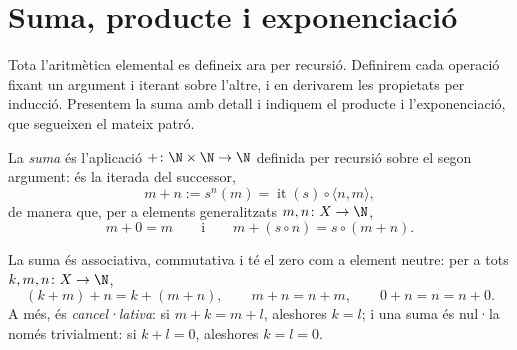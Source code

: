 \section{Suma, producte i exponenciació}\label{sec:aritmetica}

Tota l'aritmètica elemental es defineix ara per recursió. Definirem cada
operació fixant un argument i iterant sobre l'altre, i en derivarem les
propietats per inducció. Presentem la suma amb detall i indiquem el
producte i l'exponenciació, que segueixen el mateix patró.

\begin{definicio}[Suma]\label{def:suma-naturals}
La \emph{suma} és l'aplicació \(+\colon\N\times\N\to\N\) definida per
recursió sobre el segon argument: és la iterada del successor,
\[
m+n:=s^{n}(m)=\operatorname{it}(s)\circ\langle n,m\rangle,
\]
de manera que, per a elements generalitzats \(m,n\colon X\to\N\),
\[
m+0=m
\qquad\text{i}\qquad
m+(s\circ n)=s\circ(m+n).
\]
\end{definicio}

\begin{proposicio}\label{prop:suma}
La suma és associativa, commutativa i té el zero com a element neutre:
per a tots \(k,m,n\colon X\to\N\),
\[
(k+m)+n=k+(m+n),
\qquad
m+n=n+m,
\qquad
0+n=n=n+0 .
\]
A més, és \emph{cancel·lativa}: si \(m+k=m+l\), aleshores \(k=l\); i una
suma és nul·la només trivialment: si \(k+l=0\), aleshores \(k=l=0\).
\end{proposicio}

